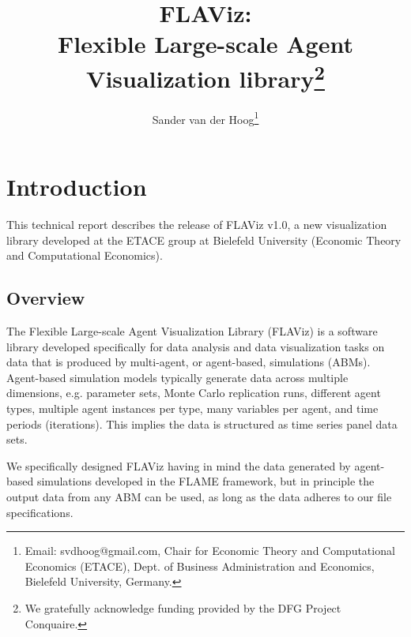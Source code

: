\documentclass[10pt,a4paper]{article}
\begin{document}
\makeatletter

\renewcommand*{\@fnsymbol}[1]{\ensuremath{\ifcase#1\or \star\or a\or b\or
   \mathsection\or \mathparagraph\or \|\or \star\star\or \dagger\dagger
   \or \ddagger\ddagger \else\@ctrerr\fi}}

\makeatother

\title{FLAViz:\\Flexible Large-scale Agent Visualization library\thanks{We gratefully acknowledge funding provided by the DFG Project Conquaire.}}

\author{Sander van der Hoog\thanks{Email: svdhoog@gmail.com, Chair for Economic Theory and Computational Economics (ETACE), Dept. of Business Administration and Economics, Bielefeld University, Germany.}}

\maketitle


\clearpage
\tableofcontents

\clearpage
\section{Introduction}
This technical report describes the release of FLAViz v1.0, a new visualization library developed at the ETACE group at Bielefeld University (Economic Theory and Computational Economics). 

\subsection{Overview}
\label{Section:1}

The Flexible Large-scale Agent Visualization Library (FLAViz) is a software library developed specifically for data analysis and data visualization tasks on data that is produced by multi-agent, or agent-based, simulations (ABMs). Agent-based simulation models typically generate data across multiple dimensions, e.g. parameter sets, Monte Carlo replication runs, different agent types, multiple agent instances per type, many variables per agent, and time periods (iterations). This implies the data is structured as time series panel data sets.

We specifically designed FLAViz having in mind the data generated by agent-based simulations developed in the FLAME framework, but in principle the output data from any ABM can be used, as long as the data adheres to our file specifications.
\end{document}

